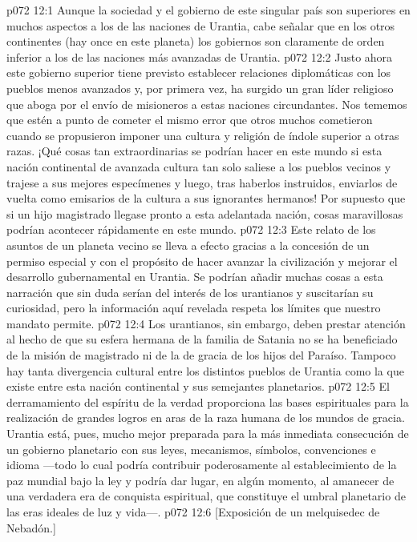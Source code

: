 \vs p072 12:1 Aunque la sociedad y el gobierno de este singular país son superiores en muchos aspectos a los de las naciones de Urantia, cabe señalar que en los otros continentes (hay once en este planeta) los gobiernos son claramente de orden inferior a los de las naciones más avanzadas de Urantia.
\vs p072 12:2 Justo ahora este gobierno superior tiene previsto establecer relaciones diplomáticas con los pueblos menos avanzados y, por primera vez, ha surgido un gran líder religioso que aboga por el envío de misioneros a estas naciones circundantes. Nos tememos que estén a punto de cometer el mismo error que otros muchos cometieron cuando se propusieron imponer una cultura y religión de índole superior a otras razas. ¡Qué cosas tan extraordinarias se podrían hacer en este mundo si esta nación continental de avanzada cultura tan solo saliese a los pueblos vecinos y trajese a sus mejores especímenes y luego, tras haberlos instruidos, enviarlos de vuelta como emisarios de la cultura a sus ignorantes hermanos! Por supuesto que si un hijo magistrado llegase pronto a esta adelantada nación, cosas maravillosas podrían acontecer rápidamente en este mundo.
\vs p072 12:3 \pc Este relato de los asuntos de un planeta vecino se lleva a efecto gracias a la concesión de un permiso especial y con el propósito de hacer avanzar la civilización y mejorar el desarrollo gubernamental en Urantia. Se podrían añadir muchas cosas a esta narración que sin duda serían del interés de los urantianos y suscitarían su curiosidad, pero la información aquí revelada respeta los límites que nuestro mandato permite.
\vs p072 12:4 \pc Los urantianos, sin embargo, deben prestar atención al hecho de que su esfera hermana de la familia de Satania no se ha beneficiado de la misión de magistrado ni de la de gracia de los hijos del Paraíso. Tampoco hay tanta divergencia cultural entre los distintos pueblos de Urantia como la que existe entre esta nación continental y sus semejantes planetarios.
\vs p072 12:5 El derramamiento del espíritu de la verdad proporciona las bases espirituales para la realización de grandes logros en aras de la raza humana de los mundos de gracia. Urantia está, pues, mucho mejor preparada para la más inmediata consecución de un gobierno planetario con sus leyes, mecanismos, símbolos, convenciones e idioma ---todo lo cual podría contribuir poderosamente al establecimiento de la paz mundial bajo la ley y podría dar lugar, en algún momento, al amanecer de una verdadera era de conquista espiritual, que constituye el umbral planetario de las eras ideales de luz y vida---.
\vsetoff
\vs p072 12:6 [Exposición de un melquisedec de Nebadón.]
